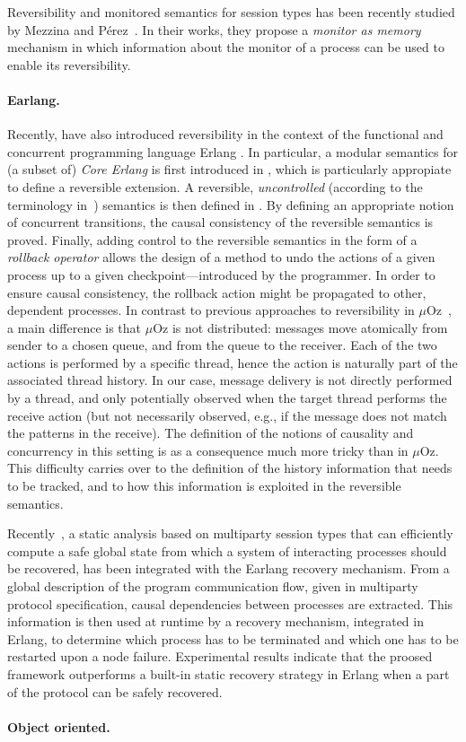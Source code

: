\documentclass[a4paper,oneside]{article}
\begin{document}
 Reversibility and monitored semantics for session types has been recently studied by Mezzina and  P\'erez~\cite{MezzinaP16a,MezzinaP16b}. In their works, they propose a \textit{monitor as memory} mechanism in which information about the monitor of a process can be used to enable its reversibility.
 
 \paragraph{Earlang.}
Recently, \cite{NPV16,LNPV17} have also introduced reversibility in the
context of the functional and concurrent programming language Erlang
\cite{AVW96}. In particular, a modular semantics for (a subset of)
\emph{Core Erlang} \cite{CGJLNPV04} is first introduced in
\cite{NPV16}, which is particularly appropiate to define a reversible
extension. A reversible, \emph{uncontrolled} (according to the
terminology in~\cite{LMT14}) semantics is then defined in
\cite{LNPV17}. By defining an appropriate notion of concurrent
transitions, the causal consistency of the reversible semantics is
proved. Finally, adding control to the reversible semantics in the
form of a \emph{rollback operator} allows the design of a method to
undo the actions of a given process up to a given
checkpoint---introduced by the programmer. In order to ensure
causal consistency, the rollback action might be propagated to other,
dependent processes.
%
In contrast to previous approaches to reversibility in
$\mu$Oz~\cite{LLMS12,GLM14}, a main difference is that $\mu$Oz is not
distributed: messages move atomically from sender to a chosen queue,
and from the queue to the receiver. Each of the two actions is
performed by a specific thread, hence the action is naturally part of
the associated thread history. In our case, message delivery is not
directly performed by a thread, and only potentially observed when the
target thread performs the receive action (but not necessarily
observed, e.g., if the message does not match the patterns in the
receive). The definition of the notions of causality and concurrency
in this setting is as a consequence much more tricky than in
$\mu$Oz. This difficulty carries over to the definition of the history
information that needs to be tracked, and to how this information is
exploited in the reversible semantics.

Recently~\cite{NY2017}, 
a static analysis based on multiparty session types that
 can efficiently compute a safe global state from which a system of interacting processes should be recovered, has been integrated with the Earlang recovery mechanism. From a global description of the program communication flow, given in multiparty protocol specification, 
  causal dependencies between processes are extracted. This information is then used at runtime by a recovery mechanism, integrated in Erlang, to determine which process has to be terminated and which one has to be restarted upon a node failure. Experimental results indicate that the proosed framework outperforms a built-in static recovery strategy in Erlang when a part of the protocol can be safely recovered. 
  
\paragraph{Object oriented.}
  


\end{document}
